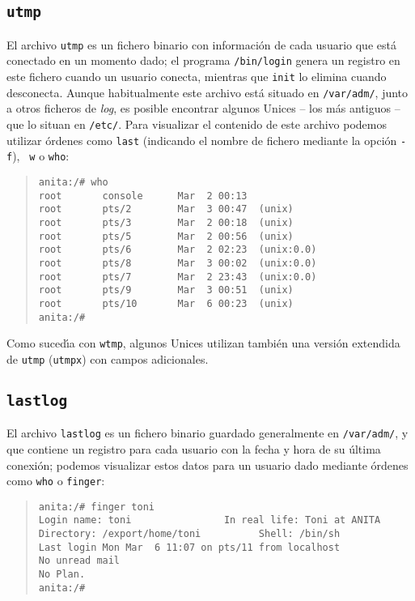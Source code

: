 \subsection{{\tt utmp}}
El archivo {\tt utmp} es un fichero binario con informaci\'on de cada usuario
que est\'a conectado en un momento dado; el programa {\tt /bin/login} genera
un registro en este fichero cuando un usuario conecta, mientras que {\tt init}
lo elimina cuando desconecta. Aunque habitualmente este archivo est\'a 
situado en {\tt /var/adm/}, junto a otros ficheros de {\it log}, es posible
encontrar algunos Unices -- los m\'as antiguos -- que lo situan en {\tt /etc/}.
Para visualizar el contenido de este archivo podemos utilizar \'ordenes como
{\tt last} (indicando el nombre de fichero mediante la opci\'on {\tt -f}), {\tt
w} o {\tt who}:
\begin{quote}
\begin{verbatim}
anita:/# who
root       console      Mar  2 00:13
root       pts/2        Mar  3 00:47  (unix)
root       pts/3        Mar  2 00:18  (unix)
root       pts/5        Mar  2 00:56  (unix)
root       pts/6        Mar  2 02:23  (unix:0.0)
root       pts/8        Mar  3 00:02  (unix:0.0)
root       pts/7        Mar  2 23:43  (unix:0.0)
root       pts/9        Mar  3 00:51  (unix)
root       pts/10       Mar  6 00:23  (unix)
anita:/# 
\end{verbatim}
\end{quote}
Como suced\'{\i}a con {\tt wtmp}, algunos Unices utilizan tambi\'en una 
versi\'on extendida de {\tt utmp} ({\tt utmpx}) con campos adicionales.
\subsection{{\tt lastlog}}
El archivo {\tt lastlog} es un fichero binario guardado generalmente en 
{\tt /var/adm/}, y que contiene un registro para cada usuario con la fecha y
hora de su \'ultima conexi\'on; podemos visualizar estos datos para un usuario
dado mediante \'ordenes como {\tt who} o {\tt finger}:
\begin{quote}
\begin{verbatim}
anita:/# finger toni
Login name: toni                In real life: Toni at ANITA
Directory: /export/home/toni          Shell: /bin/sh
Last login Mon Mar  6 11:07 on pts/11 from localhost
No unread mail
No Plan.
anita:/#
\end{verbatim}
\end{quote}
